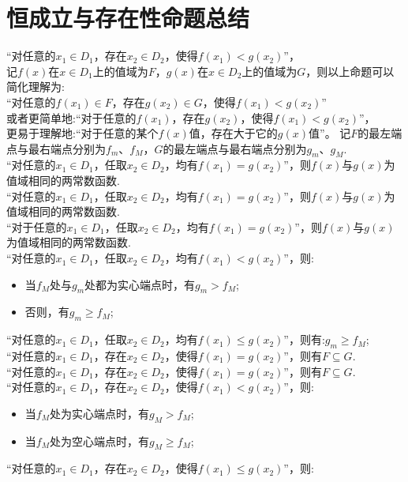\section{恒成立与存在性命题总结}
“对任意的$x_1\in D_1$，存在$x_2\in D_2$，使得$f(x_1)<g(x_2)$”，\\
记$f(x)$在$x\in D_1$上的值域为$F$，$g(x)$在$x\in D_2$上的值域为$G$，则以上命题可以简化理解为:\\
“对任意的$f(x_1)\in F$，存在$g(x_2)\in G$，使得$f(x_1)<g(x_2)$”\\
或者更简单地:“对于任意的$f(x_1)$，存在$g(x_2)$，使得$f(x_1)<g(x_2)$”，\\
更易于理解地:“对于任意的某个$f(x)$值，存在大于它的$g(x)$值”。
\newline
记$F$的最左端点与最右端点分别为$f_m$、$f_M$，$G$的最左端点与最右端点分别为$g_m$、$g_M$.\\
\newline
“对任意的$x_1\in D_1$，任取$x_2\in D_2$，均有$f(x_1)=g(x_2)$”，则$f(x)$与$g(x)$为值域相同的两常数函数.\\%
“对任意的$x_1\in D_1$，任取$x_2\in D_2$，均有$f(x_1)=g(x_2)$”，则$f(x)$与$g(x)$为值域相同的两常数函数.\\%
“对于任意的$x_1\in D_1$，任取$x_2\in D_2$，均有$f(x_1)=g(x_2)$”，则$f(x)$与$g(x)$为值域相同的两常数函数.\\%
“对任意的$x_1\in D_1$，任取$x_2\in D_2$，均有$f(x_1)<g(x_2)$”，则:
\begin{itemize}
    \item 当$f_M$处与$g_m$处都为实心端点时，有$g_m>f_M$;
    \item 否则，有$g_m\geqslant f_M$;
\end{itemize}
“对任意的$x_1\in D_1$，任取$x_2\in D_2$，均有$f(x_1)\leqslant g(x_2)$”，则有:$g_m\geqslant f_M$;\\
\newline
“对任意的$x_1\in D_1$，存在$x_2\in D_2$，使得$f(x_1)=g(x_2)$”，则有$F\subseteq G$.\\%
“对任意的$x_1\in D_1$，存在$x_2\in D_2$，使得$f(x_1)=g(x_2)$”，则有$F\subseteq G$.\\
“对任意的$x_1\in D_1$，存在$x_2\in D_2$，使得$f(x_1)<g(x_2)$”，则:
\begin{itemize}
    \item 当$f_M$处为实心端点时，有$g_M>f_M$;
    \item 当$f_M$处为空心端点时，有$g_M\geqslant f_M$;
\end{itemize}
“对任意的$x_1\in D_1$，存在$x_2\in D_2$，使得$f(x_1) \leqslant g(x_2)$”，则:
